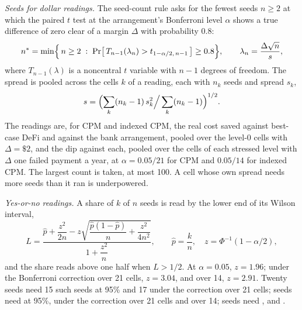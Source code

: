 \emph{Seeds for dollar readings.} The seed-count rule asks for the fewest seeds $n \ge 2$ at which the paired $t$ test at
the arrangement's Bonferroni level $\alpha$ shows a true difference of zero clear of a margin $\Delta$ with
probability 0.8:
\begin{equation}
  n^{*} = \min\Bigl\{\, n \ge 2 \;:\; \Pr\bigl[\,T_{n-1}(\lambda_{n}) > t_{1-\alpha/2,\,n-1}\,\bigr] \ge 0.8 \Bigr\},
  \qquad \lambda_{n} = \frac{\Delta\sqrt{n}}{s},
  \label{eq:seeds}
\end{equation}
where $T_{n-1}(\lambda)$ is a noncentral $t$ variable with $n-1$ degrees of freedom. The spread is pooled across the
cells $k$ of a reading, each with $n_{k}$ seeds and spread $s_{k}$,
\begin{equation}
  s = \Bigl(\sum_{k}(n_{k}-1)\,s_{k}^{2} \Big/ \sum_{k}(n_{k}-1)\Bigr)^{1/2}.
  \label{eq:pooled}
\end{equation}
The readings are, for CPM and indexed CPM, the real cost saved against best-case DeFi and against the bank
arrangement, pooled over the level-0 cells with $\Delta = \$2$, and the dip against each, pooled over the cells of
each stressed level with $\Delta$ one failed payment a year, at $\alpha = 0.05/21$ for CPM and $0.05/14$ for indexed
CPM. The largest count is taken, at most 100. A cell whose own spread needs more seeds than it ran is underpowered.

\emph{Yes-or-no readings.} A share of $k$ of $n$ seeds is read by the lower end of its Wilson interval,
\begin{equation}
  L = \frac{\hat{p} + \dfrac{z^{2}}{2n} - z\sqrt{\dfrac{\hat{p}(1-\hat{p})}{n} + \dfrac{z^{2}}{4n^{2}}}}
           {1 + \dfrac{z^{2}}{n}}, \qquad \hat{p} = \frac{k}{n}, \quad z = \Phi^{-1}(1-\alpha/2),
  \label{eq:wilson}
\end{equation}
and the share reads above one half when $L > 1/2$. At $\alpha = 0.05$, $z = 1.96$; under the Bonferroni correction
over 21 cells, $z = 3.04$, and over 14, $z = 2.91$. Twenty seeds need 15 such seeds at 95\% and 17 under the
correction over 21 cells; \SeedsConfirm{} seeds need \WilsonConfirm{} at 95\%, \WilsonConfirmBonf{} under the
correction over 21 cells and \WilsonConfirmBonfIndexed{} over 14; \SeedsExtended{} seeds need \WilsonExtended{},
\WilsonExtendedBonf{} and \WilsonExtendedBonfIndexed{}.

